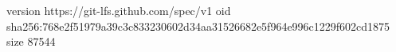 version https://git-lfs.github.com/spec/v1
oid sha256:768e2f51979a39c3c833230602d34aa31526682e5f964e996c1229f602cd1875
size 87544
